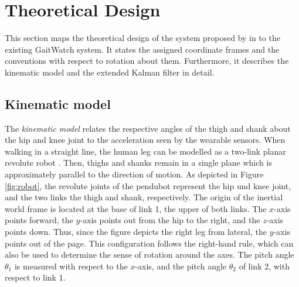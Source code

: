 \section{Theoretical Design}\label{sec:theoretical_design}

This section maps the theoretical design of the system proposed by \citeauthor{bennett_motion_2014} in \cite{bennett_motion_2014} to the existing GaitWatch system. It states the assigned coordinate frames and the conventions with respect to rotation about them. Furthermore, it describes the kinematic model and the extended Kalman filter in detail.

\subsection{Kinematic model}

The \emph{kinematic model} relates the respective angles of the thigh and shank about the hip and knee joint to the acceleration seen by the wearable sensors. When walking in a straight line, the human leg can be modelled as a two-link planar revolute robot \cite{bennett_motion_2014}. Then, thighs and shanks remain in a single plane which is approximately parallel to the direction of motion. As depicted in Figure \ref{fig:robot}, the revolute joints of the \gls{pendubot} represent the hip und knee joint, and the two links the thigh and shank, respectively. The origin of the inertial world frame is located at the base of link 1, the upper of both links. The $x$-axis points forward, the $y$-axis points out from the hip to the right, and the $z$-axis points down. Thus, since the figure depicts the right leg from lateral, the $y$-axis points out of the page. This configuration follows the right-hand rule, which can also be used to determine the sense of rotation around the axes. The pitch angle $\theta_1$ is measured with respect to the $x$-axis, and the pitch angle $\theta_2$ of link 2, with respect to link 1. 

